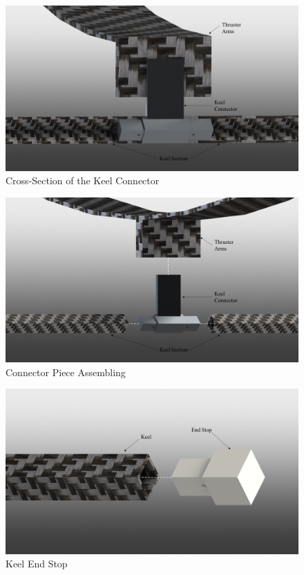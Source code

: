 \documentclass[../main.tex]{subfiles}
\begin{document}
\begin{figure}[H]
	\centering
	\includegraphics[width=.8\linewidth]{img/design/keel/thrusterArmConnectorCrossSection.png}
	\caption{Cross-Section of the Keel Connector}
	\label{fig:thrusterArmConnectorCrossSection}
\end{figure}
\begin{figure}[H]
	\centering
	\includegraphics[width=.8\linewidth]{img/design/keel/thrusterArmConnectorPiece.png}
	\caption{Connector Piece Assembling}
	\label{fig:fig:thrusterArmConnectorPiece}
\end{figure}
\begin{figure}[H]
	\centering
	\includegraphics[width=.8\linewidth]{img/design/keel/keelEndCap.png}
	\caption{Keel End Stop}
	\label{fig:keelEndCap}
\end{figure}
\end{document}
